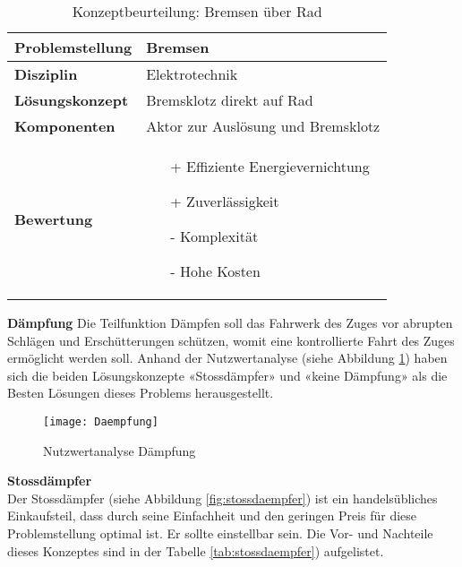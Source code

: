 \documentclass[../../main.tex]{subfiles}
\begin{document}
\begin{flushleft}
    \begin{table}[h]
    \begin{tabular}{ | l | p{11cm} |}
    \hline
    \textbf{Problemstellung} & Bremsen \\ \hline
    \textbf{Disziplin} & Elektrotechnik \\ \hline
    \textbf{Lösungskonzept} & Bremsklotz direkt auf Rad \\ \hline
    \textbf{Komponenten} & Aktor zur Auslösung und Bremsklotz \\ \hline
    \textbf{Bewertung} &  \begin{itemize}
                            \item[+] Effiziente Energievernichtung
                            \item[+] Zuverlässigkeit
                            \item[-] Komplexität 
                            \item[-] Hohe Kosten
                          \end{itemize} \\ \hline
    \end{tabular}
    \caption{Konzeptbeurteilung: Bremsen über Rad}
    \label{tab:radbremse}
\end{table}
\end{flushleft}

  \textbf{Dämpfung}
  Die Teilfunktion Dämpfen soll das Fahrwerk des Zuges vor abrupten Schlägen und Erschütterungen schützen, womit eine kontrollierte Fahrt des Zuges ermöglicht werden soll. Anhand der Nutzwertanalyse (siehe Abbildung \ref{fig:daempfung}) haben sich die beiden Lösungskonzepte «Stossdämpfer» und «keine Dämpfung» als die Besten Lösungen dieses Problems herausgestellt.

  \begin{figure}[H] %
    \centering
    \texttt{[image: Daempfung]}
    \caption{Nutzwertanalyse Dämpfung}
    \label{fig:daempfung}
\end{figure}

  \textbf{Stossdämpfer}\\
  Der Stossdämpfer (siehe Abbildung \ref{fig:stossdaempfer}) ist ein handelsübliches Einkaufsteil, dass durch seine Einfachheit und den geringen Preis für diese Problemstellung optimal ist. Er sollte einstellbar sein. Die Vor- und Nachteile dieses Konzeptes sind in der Tabelle \ref{tab:stossdaempfer}) aufgelistet.
\end{document}
